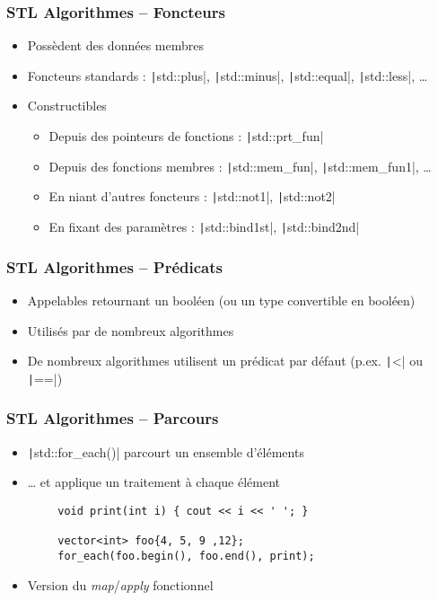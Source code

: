 \documentclass[C++.tex]{subfiles}
\begin{document}
\begin{frame}[fragile]
	\frametitle{STL Algorithmes -- Foncteurs}
	\begin{itemize}
		\item Possèdent des données membres


		\item Foncteurs standards : \texttt|std::plus|, \texttt|std::minus|, \texttt|std::equal|, \texttt|std::less|, \ldots{}
		\item Constructibles
		\begin{itemize}
			\item Depuis des pointeurs de fonctions : \texttt|std::prt_fun|
			\item Depuis des fonctions membres : \texttt|std::mem_fun|, \texttt|std::mem_fun1|, \ldots{}
			\item En niant d'autres foncteurs : \texttt|std::not1|, \texttt|std::not2|
			\item En fixant des paramètres : \texttt|std::bind1st|, \texttt|std::bind2nd|
		\end{itemize}
	\end{itemize}
\end{frame}

\begin{frame}[fragile]
	\frametitle{STL Algorithmes -- Prédicats}
	\begin{itemize}
		\item Appelables retournant un booléen (ou un type convertible en booléen)
		\item Utilisés par de nombreux algorithmes
		\item De nombreux algorithmes utilisent un prédicat par défaut (p.ex. \texttt|<| ou \texttt|==|)
	\end{itemize}
\end{frame}

\begin{frame}[fragile]
	\frametitle{STL Algorithmes -- Parcours}
	\begin{itemize}
		\item \texttt|std::for_each()| parcourt un ensemble d'éléments
		\item \ldots{} et applique un traitement à chaque élément
	\end{itemize}

	\begin{verbatim}
		void print(int i) { cout << i << ' '; }

		vector<int> foo{4, 5, 9 ,12};
		for_each(foo.begin(), foo.end(), print);
	\end{verbatim}

	\begin{itemize}
		\item Version du \textit{map}/\textit{apply} fonctionnel
	\end{itemize}
\end{frame}
\end{document}

